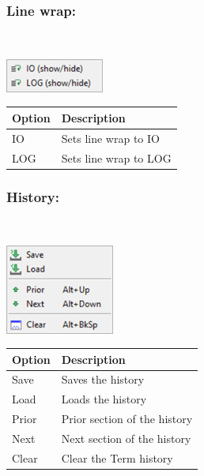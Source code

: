 \hypertarget{menu_r_term_linewrap}{}
\subsubsection{Line wrap:}\\

\includegraphics[scale=0.50]{./res/menu_r_term_linewrap.png}\\

\begin{scriptsize}
  \begin{tabularx}{\textwidth}{>{\hsize=0.3\hsize}X>{\hsize=0.7\hsize}X}\\
    \hline
    \textbf{Option} & \textbf{Description} \\
    \hline
    IO & Sets line wrap to IO \\
    LOG & Sets line wrap to LOG \\
    \hline
  \end{tabularx}
\end{scriptsize}

\subsubsection{History:}\\

\includegraphics[scale=0.50]{./res/menu_r_term_history.png}\\

\begin{scriptsize}
  \begin{tabularx}{\textwidth}{>{\hsize=0.3\hsize}X>{\hsize=0.7\hsize}X}\\
    \hline
    \textbf{Option} & \textbf{Description} \\
    \hline
    Save & Saves the history \\
    Load & Loads the history \\
    \hdashline[1pt/1pt]
    Prior & Prior section of the history \\
    Next & Next section of the history \\
    \hdashline[1pt/1pt]
    Clear & Clear the Term history \\
    \hline
  \end{tabularx}
\end{scriptsize}

